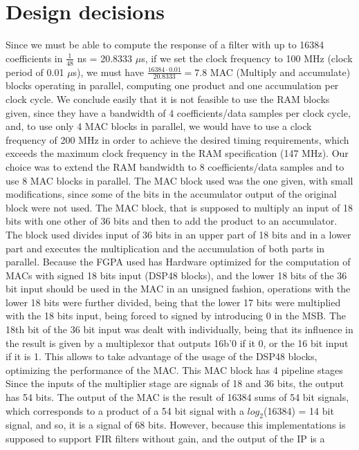 \documentclass[12pt]{article}
\begin{document}
\section{Design decisions}
Since we must be able to compute the response of a filter with up to 16384 coefficients in
$\frac{1}{48}$ ns = 20.8333 $\mu$s, if we set the clock frequency to 100 MHz (clock period of 0.01
$\mu$s), we must have $\frac{16384\cdot0.01}{20.8333} = 7.8$ MAC (Multiply and accumulate) blocks
operating in parallel, computing one product and one accumulation per clock cycle. We conclude
easily that it is not feasible to use the RAM blocks given, since they have a bandwidth of 4
coefficients/data samples per clock cycle, and, to use only 4 MAC blocks in parallel, we would have
to use a clock frequency of 200 MHz in order to achieve the desired timing requirements, which
exceeds the maximum clock frequency in the RAM specification (147 MHz). Our choice was to extend the
RAM bandwidth to 8 coefficients/data samples and to use 8 MAC blocks in parallel. The MAC block used
was the one given, with small modifications, since some of the bits in the accumulator output of the
original block were not used. The MAC block, that is supposed to multiply an input of 18 bits with
one other of 36 bits and then to add the product to an accumulator. The block used divides input of
36 bits in an upper part of 18 bits and in a lower part and executes the multiplication and the
accumulation of both parts in parallel. Because the FGPA used has Hardware optimized for the
computation of MACs with signed 18 bits input (DSP48 blocks), and the lower 18 bits of the 36 bit
input should be used in the MAC in an unsigned fashion, operations with the lower 18 bits were
further divided, being that the lower 17 bits were multiplied with the 18 bits input, being forced
to signed by introducing 0 in the MSB. The 18th bit of the 36 bit input was dealt with individually,
being that its influence in the result is given by a multiplexor that outputs 16b'0 if it 0, or the
16 bit input if it is 1. This allows to take advantage of the usage of the DSP48 blocks, optimizing
the performance of the MAC. This MAC block has 4 pipeline stages Since the inputs of the multiplier
stage are signals of 18 and 36 bits, the output has 54 bits. The output of the MAC is the result of
16384 sums of 54 bit signals, which corresponds to a product of a 54 bit signal with a
$log_2$(16384) = 14 bit signal, and so, it is a signal of 68 bits. However, because this
implementations is supposed to support FIR filters without gain, and the output of the IP is a
\end{document}
